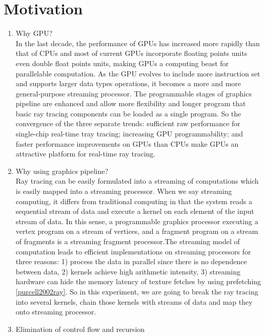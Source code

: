  \section{Motivation}
\begin{enumerate}
    \item Why GPU? \\
    In the last decade, the performance of GPUs has increased more rapidly than that of CPUs and most of current GPUs incorporate floating points units even double float points units, making GPUs a computing beast for parallelable computation. As the GPU evolves to include more instruction set and supports larger data types operations, it becomes a more and more general-purpose streaming processor. The programmable stages of graphics pipeline are enhanced and allow more flexibility and longer program that basic ray tracing components can be loaded as a single program. So the convergence of the three separate trends: sufficient raw performance for single-chip real-time tray tracing; increasing GPU programmability; and faster performance improvements on GPUs than CPUs make GPUs an attractive platform for real-time ray tracing.
    \item Why using graphics pipeline?\\
    Ray tracing can be easily formulated into a streaming of computations which is easily mapped into a streaming processor. When we say streaming computing, it differs from traditional computing in that the system reads a sequential stream of data and execute a kernel on each element of the input stream of data. In this sense, a programmable graphics processor executing a vertex program on a stream of vertices, and a fragment program on a stream of fragments is a streaming fragment processor.The streaming model of computation leads to efficient implementations on streaming processors for three reasons: 1) process the data in parallel since there is no dependence between data, 2) kernels achieve high arithmetic intensity, 3) streaming hardware can hide the memory latency of texture fetches by using prefetching \ref{purcell2002ray}. So in this experiment, we are going to break the ray tracing into several kernels, chain those kernels with streams of data and map they onto streaming processor.
    \item Elimination of control flow and recursion\\

\end{enumerate}
